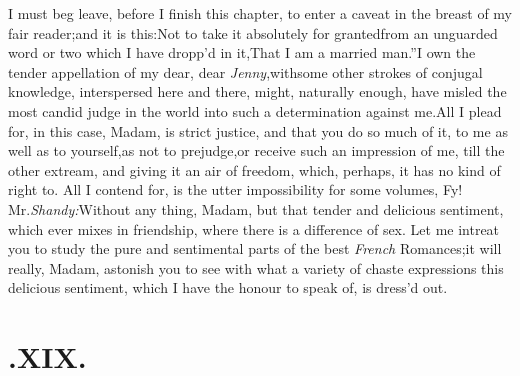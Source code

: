 \documentclass[twoside]{article}
\begin{document}
I must beg leave, before I finish this chapter, to enter a
caveat in the breast of my fair reader;\tsk and it is
this:\tsh\break Not to take it absolutely for granted\break from an
unguarded word or two which I have dropp’d in
it,\tsh\lqq That I am a married
man.”\tsk I own the tender appel\-lation of my dear, dear
\textit{Jenny},\tsk with\break some other strokes of conjugal know\-ledge,
interspersed here and there, might, naturally enough, have misled
the most candid judge in the world into such a determination
against me.\tsk All I plead for, in this case, Madam, is strict
justice, and that you do so much of it, to me as well as to
yourself,\tsk as not to prejudge,\break or receive such an impression
of me, till
the other
extream, and giving it an air of freedom, which, perhaps, it has no
kind of right to. All I contend for, is the utter impossibility
for some volumes, 
Fy! Mr.\@ \textit{Shandy:}\tsk Without
any thing, Madam, but that tender and delicious\break
sentiment, which ever mixes in friend\-ship, where there is a difference of sex.\break
Let me intreat you to study the pure\break
and sentimental parts of the best \textit{French}\break 
Romances;\tsh it will really, Madam,\break
astonish you to see with what a variety of chaste expressions
this delicious sentiment, which I have the honour to speak of,
is dress’d out.

\section{\chapstrut{}.\enspace XIX.}
\end{document}
